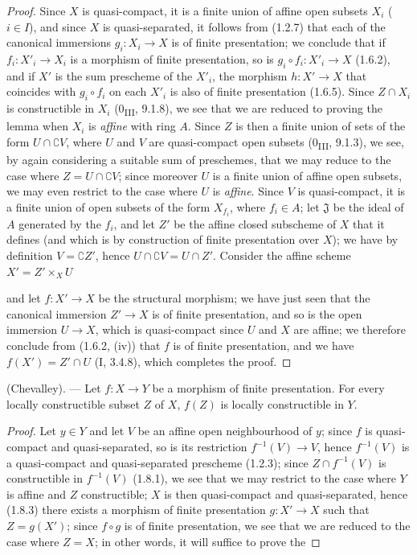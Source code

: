 \begin{proof}
Since $X$ is quasi-compact, it is a finite union of affine open subsets $X_i$
($i\in I$), and since $X$ is quasi-separated, it follows from (1.2.7) that
each of the canonical immersions $g_i:X_i\to X$ is of finite presentation; we
conclude that if $f_i:X'_i\to X_i$ is a morphism of finite presentation, so
is $g_i\circ f_i:X'_i\to X$ (1.6.2), and if $X'$ is the sum prescheme of the
$X'_i$, the morphism $h:X'\to X$ that coincides with $g_i\circ f_i$ on each
$X'_i$ is also of finite presentation (1.6.5). Since $Z\cap X_i$ is
constructible in $X_i$ (0\textsubscript{III}, 9.1.8), we see that we are
reduced to proving the lemma when $X_i$ is \emph{affine} with ring $A$. Since
$Z$ is then a finite union of sets of the form $U\cap\complement V$, where
$U$ and $V$ are quasi-compact open subsets (0\textsubscript{III}, 9.1.3), we
see, by again considering a suitable sum of preschemes, that we may reduce to
the case where $Z=U\cap\complement V$; since moreover $U$ is a finite union
of affine open subsets, we may even restrict to the case where $U$ is
\emph{affine}. Since $V$ is quasi-compact, it is a finite union of open
subsets of the form $X_{f_i}$, where $f_i\in A$; let $\mathfrak J$ be the
ideal of $A$ generated by the $f_i$, and let $Z'$ be the affine closed
subscheme of $X$ that it defines (and which is by construction of finite
presentation over $X$); we have by definition $V=\complement Z'$, hence
$U\cap\complement V=U\cap Z'$. Consider the affine scheme $X'=Z'\times_XU$


and let $f:X'\to X$ be the structural morphism; we have just seen that
the canonical immersion $Z'\to X$ is of finite presentation, and so is
the open immersion $U\to X$, which is quasi-compact since $U$ and
$X$ are affine; we therefore conclude from (1.6.2, (iv)) that $f$ is of
finite presentation, and we have $f(X')=Z'\cap U$ (I, 3.4.8), which completes
the proof.
\end{proof}

\begin{theorem}[1.8.4]
\label{IV.1.8.4}
\textup{(Chevalley).} --- Let $f:X\to Y$ be a morphism of finite
presentation. For every locally constructible subset $Z$ of $X$, $f(Z)$ is
locally constructible in $Y$.
\end{theorem}

\begin{proof}
Let $y\in Y$ and let $V$ be an affine open neighbourhood of $y$; since $f$ is
quasi-compact and quasi-separated, so is its restriction
$f^{-1}(V)\to V$, hence $f^{-1}(V)$ is a quasi-compact and
quasi-separated prescheme (1.2.3); since $Z\cap f^{-1}(V)$ is constructible
in $f^{-1}(V)$ (1.8.1), we see that we may restrict to the case where $Y$ is
affine and $Z$ constructible; $X$ is then quasi-compact and quasi-separated,
hence (1.8.3) there exists a morphism of finite presentation $g:X'\to X$ such
that $Z=g(X')$; since $f\circ g$ is of finite presentation, we see that we
are reduced to the case where $Z=X$; in other words, it will suffice to
prove the
\end{proof}

